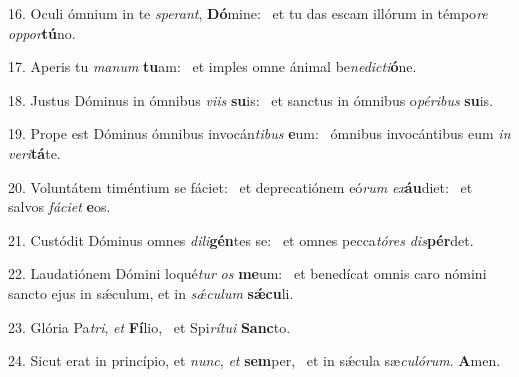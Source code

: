 16. Oculi ómnium in te \textit{spe}\textit{rant}, \textbf{Dó}mine: \ast\  et tu das escam illórum in témpo\textit{re} \textit{op}\textit{por}\textbf{tú}no.\

17. Aperis tu \textit{ma}\textit{num} \textbf{tu}am: \ast\  et imples omne ánimal be\textit{ne}\textit{dic}\textit{ti}\textbf{ó}ne.\

18. Justus Dóminus in ómnibus \textit{vi}\textit{is} \textbf{su}is: \ast\  et sanctus in ómnibus o\textit{pé}\textit{ri}\textit{bus} \textbf{su}is.\

19. Prope est Dóminus ómnibus invocán\textit{ti}\textit{bus} \textbf{e}um: \ast\  ómnibus invocántibus eum \textit{in} \textit{ve}\textit{ri}\textbf{tá}te.\

20. Voluntátem timéntium se fáciet: \dag\  et deprecatiónem eó\textit{rum} \textit{ex}\textbf{áu}diet: \ast\  et salvos \textit{fá}\textit{ci}\textit{et} \textbf{e}os.\

21. Custódit Dóminus omnes \textit{di}\textit{li}\textbf{gén}tes se: \ast\  et omnes pecca\textit{tó}\textit{res} \textit{dis}\textbf{pér}det.\

22. Laudatiónem Dómini loqué\textit{tur} \textit{os} \textbf{me}um: \ast\  et benedícat omnis caro nómini sancto ejus in sǽculum, et in \textit{sǽ}\textit{cu}\textit{lum} \textbf{sǽ}\textbf{cu}li.\

23. Glória Pa\textit{tri}, \textit{et} \textbf{Fí}lio, \ast\  et Spi\textit{rí}\textit{tu}\textit{i} \textbf{Sanc}to.\

24. Sicut erat in princípio, et \textit{nunc}, \textit{et} \textbf{sem}per, \ast\  et in sǽcula sæ\textit{cu}\textit{ló}\textit{rum}. \textbf{A}men.\

